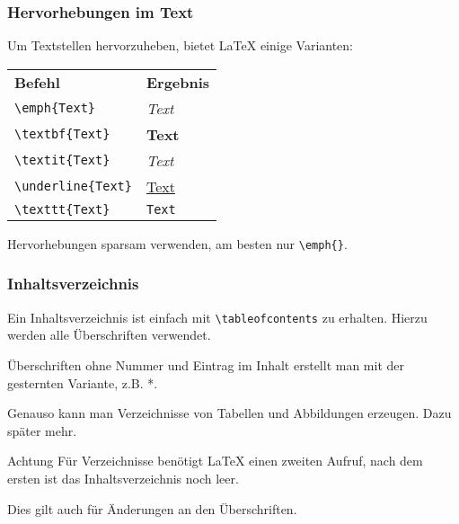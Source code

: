 \begin{frame}[fragile]
    \frametitle{Hervorhebungen im Text}
    
    Um Textstellen hervorzuheben, bietet \LaTeX{} einige Varianten:
    \medskip
    \begin{center}
        \begin{tabular}{ll}
            \textbf{Befehl} & \textbf{Ergebnis}\\
            \verb+\emph{Text}+ & \emph{Text}\pause\\
            \verb+\textbf{Text}+ & \textbf{Text}\pause\\
            \verb+\textit{Text}+ & \textit{Text}\pause\\
            \verb+\underline{Text}+ & \underline{Text}\pause\\
            \verb+\texttt{Text}+ & \texttt{Text}
        \end{tabular}
    \end{center}
    \pause\medskip
    
    Hervorhebungen sparsam verwenden, am besten nur \verb|\emph{}|.
\end{frame}


\begin{frame}[fragile]
    \frametitle{Inhaltsverzeichnis}
    Ein Inhaltsverzeichnis ist einfach mit \verb+\tableofcontents+ zu erhalten. Hierzu werden alle Überschriften verwendet.
    \medskip\pause
    
    Überschriften ohne Nummer und Eintrag im Inhalt erstellt man mit der gesternten Variante, z.B. *.
    
    \medskip\pause
    Genauso kann man Verzeichnisse von Tabellen und Abbildungen erzeugen. Dazu später mehr.
    
    \medskip\pause
    \begin{alertblock}{Achtung}
        Für Verzeichnisse benötigt \LaTeX{} einen zweiten Aufruf, nach dem ersten ist das Inhaltsverzeichnis noch leer.
    
        \smallskip
        Dies gilt auch für Änderungen an den Überschriften.
    \end{alertblock}
\end{frame}


